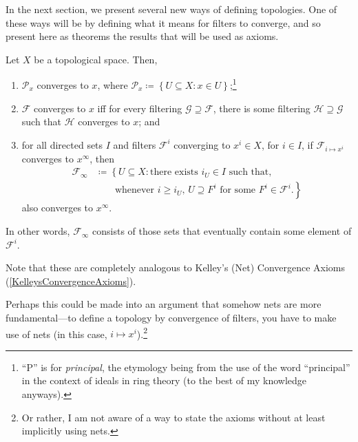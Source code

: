 In the next section, we present several new ways of defining topologies.  One of these ways will be by defining what it means for filters to converge, and so present here as theorems the results that will be used as axioms.
\begin{prp}\label{KelleysFilterConvergenceAxioms}
Let $X$ be a topological space.  Then,
\begin{enumerate}
\item \label{enmKelleysFilterConvergenceAxioms.i}$\mathcal{P}_x$ converges to $x$, where $\mathcal{P}_x\coloneqq \left\{ U\subseteq X:x\in U\right\}$;\footnote{``P'' is for \emph{principal}, the etymology being from the use of the word ``principal'' in the context of ideals in ring theory (to the best of my knowledge anyways).}
\item \label{enmKelleysFilterConvergenceAxioms.ii}$\mathcal{F}$ converges to $x$ iff for every filtering $\mathcal{G}\supseteq \mathcal{F}$, there is some filtering $\mathcal{H}\supseteq \mathcal{G}$ such that $\mathcal{H}$ converges to $x$; and
\item \label{enmKelleysFilterConvergenceAxioms.iii}for all directed sets $I$ and filters $\mathcal{F}^i$ converging to $x^i\in X$, for $i\in I$, if $\mathcal{F}_{i\mapsto x^i}$ converges to $x^\infty$, then
\begin{equation}
\begin{split}
\mathcal{F}_\infty & \coloneqq \left\{ U\subseteq X:\text{there exists }i_U\in I\text{ such that,}\right. \\
& \qquad \left. \text{whenever }i\geq i_U\text{, }U\supseteq F^i\text{ for some }F^i\in \mathcal{F}^i.\right\}
\end{split}
\end{equation}
also converges to $x^\infty$.
\end{enumerate}
\begin{rmk}
In other words, $\mathcal{F}_{\infty}$ consists of those sets that eventually contain some element of $\mathcal{F}^i$.
\end{rmk}
\begin{rmk}
Note that these are completely analogous to Kelley's (Net) Convergence Axioms (\cref{KelleysConvergenceAxioms}).
\end{rmk}
\begin{rmk}
Perhaps this could be made into an argument that somehow nets are more fundamental---to define a topology by convergence of filters, you have to make use of nets (in this case, $i\mapsto x^i$).\footnote{Or rather, I am not aware of a way to state the axioms without at least implicitly using nets.}

\end{rmk}
\end{prp}
